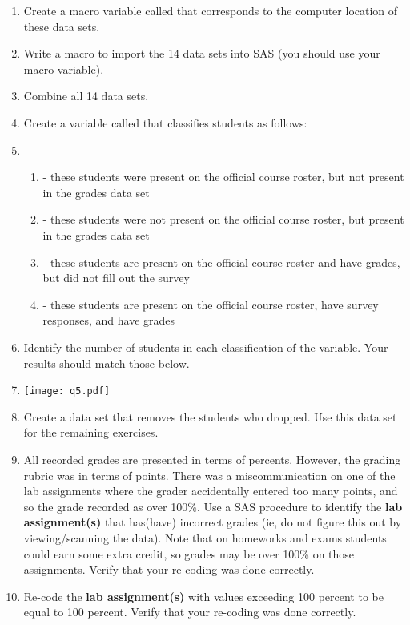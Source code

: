 \begin{enumerate}
\item Create a macro variable called  that corresponds to the computer location of these data sets.
\item Write a macro to import the 14 data sets into SAS (you should use your  macro variable).
\item Combine all 14 data sets.
\item Create a variable called  that classifies students as follows:
\item[]
\begin{enumerate}
\item {} - these students were present on the official course roster, but not present in the grades data set
\item {} - these students were not present on the official course roster, but present in the grades data set
\item {} - these students are present on the official course roster and have grades, but did not fill out the survey
\item {} - these students are present on the official course roster, have survey responses, and have grades
\end{enumerate}
\item Identify the number of students in each classification of the  variable.  Your results should match those below.
\item[]\texttt{[image: q5.pdf]}
\item Create a data set that removes the students who dropped.  Use this data set for the remaining exercises.
\item All recorded grades are presented in terms of percents.  However, the grading rubric was in terms of points.  There was a miscommunication on one of the lab assignments where the grader accidentally entered too many points, and so the grade recorded as over 100\%.  Use a SAS procedure to identify the \textbf{lab assignment(s)} that has(have) incorrect grades (ie, do not figure this out by viewing/scanning the data). Note that on homeworks and exams students could earn some extra credit, so grades may be over 100\% on those assignments.  Verify that your re-coding was done correctly.
\item Re-code the \textbf{lab assignment(s)} with values exceeding 100 percent to be equal to 100 percent.  Verify that your re-coding was done correctly.

\end{enumerate}
